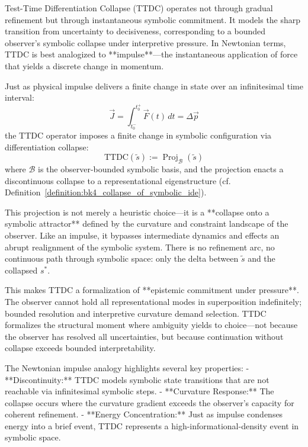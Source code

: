 \begin{scholium}
\label{scholium:bk4_ttdc_impulse_collapse}
Test-Time Differentiation Collapse (TTDC) operates not through gradual refinement but through instantaneous symbolic commitment. It models the sharp transition from uncertainty to decisiveness, corresponding to a bounded observer's symbolic collapse under interpretive pressure. In Newtonian terms, TTDC is best analogized to **impulse**—the instantaneous application of force that yields a discrete change in momentum.

Just as physical impulse delivers a finite change in state over an infinitesimal time interval:
\[
\vec{J} = \int_{t_0^-}^{t_0^+} \vec{F}(t)\,dt = \Delta \vec{p}
\]
the TTDC operator imposes a finite change in symbolic configuration via differentiation collapse:
\[
\mathrm{TTDC}(\tilde{s}) := \operatorname{Proj}_{\mathcal{B}}(\tilde{s})
\]
where $\mathcal{B}$ is the observer-bounded symbolic basis, and the projection enacts a discontinuous collapse to a representational eigenstructure (cf. Definition~\ref{definition:bk4_collapse_of_symbolic_ide}).

This projection is not merely a heuristic choice—it is a **collapse onto a symbolic attractor** defined by the curvature and constraint landscape of the observer. Like an impulse, it bypasses intermediate dynamics and effects an abrupt realignment of the symbolic system. There is no refinement arc, no continuous path through symbolic space: only the delta between $\tilde{s}$ and the collapsed $s^*$.

This makes TTDC a formalization of **epistemic commitment under pressure**. The observer cannot hold all representational modes in superposition indefinitely; bounded resolution and interpretive curvature demand selection. TTDC formalizes the structural moment where ambiguity yields to choice—not because the observer has resolved all uncertainties, but because continuation without collapse exceeds bounded interpretability.

The Newtonian impulse analogy highlights several key properties:
- **Discontinuity:** TTDC models symbolic state transitions that are not reachable via infinitesimal symbolic steps.
- **Curvature Response:** The collapse occurs where the curvature gradient exceeds the observer’s capacity for coherent refinement.
- **Energy Concentration:** Just as impulse condenses energy into a brief event, TTDC represents a high-informational-density event in symbolic space.


\end{scholium}
